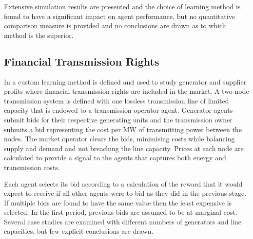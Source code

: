 Extensive simulation results are presented and the choice of learning method is
found to have a significant impact on agent performance, but no quantitative
comparison measure is provided and no conclusions are drawn as to which method
is the superior.

\subsection{Financial Transmission Rights}
In  a custom learning method is defined and used to study
generator and supplier profits where financial transmission rights are included
in the market.  A two node transmission system is defined with one lossless
transmission line of limited capacity that is endowed to a transmission
operator agent.  Generator agents submit bids for their respective generating
units and the transmission owner submits a bid representing the cost per MW of
transmitting power between the nodes.  The market operator clears the bids,
minimising costs while balancing supply and demand and not breaching the line
capacity.  Prices at each node are calculated to provide a signal to the
agents that captures both energy and transmission costs.

Each agent selects its bid according to a calculation of the reward that it
would expect to receive if all other agents were to bid as they did in the previous stage.  If multiple bids are found to have
the same value then the least expensive is selected.  In the first period,
previous bids are assumed to be at marginal cost.  Several case studies are
examined with different numbers of generators and line capacities, but few
explicit conclusions are drawn.


